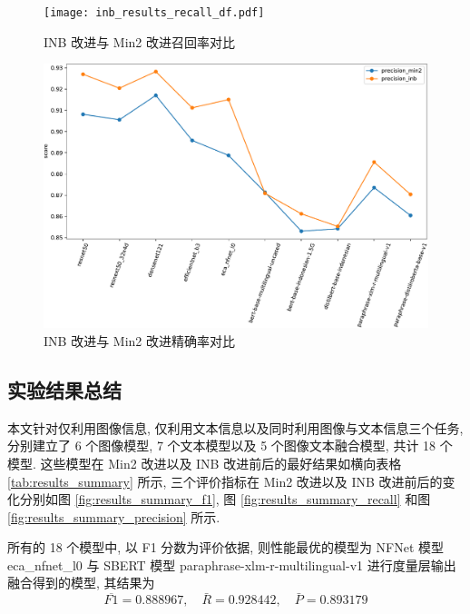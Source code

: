 \documentclass[12pt]{article}
\begin{document}
\begin{figure}[htbp]
  \centering
  \texttt{[image: inb\_results\_recall\_df.pdf]}
  \caption{INB 改进与 Min2 改进召回率对比}
  \label{fig:inb_results_recall}
\end{figure}

\begin{figure}[htbp]
  \centering
  \includegraphics[width=14cm]{inb_results_precision_df.pdf}
  \caption{INB 改进与 Min2 改进精确率对比}
  \label{fig:inb_results_precision}
\end{figure}

\subsection{实验结果总结}

本文针对仅利用图像信息, 仅利用文本信息以及同时利用图像与文本信息三个任务, 分别建立了 6 个图像模型, 7 个文本模型以及 5 个图像文本融合模型, 共计 18 个模型. 这些模型在 Min2 改进以及 INB 改进前后的最好结果如横向表格 \ref{tab:results_summary} 所示, 三个评价指标在 Min2 改进以及 INB 改进前后的变化分别如图 \ref{fig:results_summary_f1}, 图 \ref{fig:results_summary_recall} 和图 \ref{fig:results_summary_precision} 所示. 

所有的 18 个模型中, 以 F1 分数为评价依据, 则性能最优的模型为 NFNet 模型 eca\_nfnet\_l0 与 SBERT 模型 paraphrase-xlm-r-multilingual-v1 进行度量层输出融合得到的模型, 其结果为
\begin{equation}
  \overline{F1}=0.888967,\quad\bar{R}=0.928442,\quad\bar{P}=0.893179
\end{equation}
\end{document}
